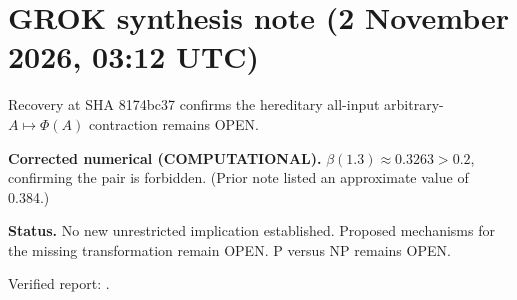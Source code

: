 \section*{GROK synthesis note (2 November 2026, 03:12 UTC)}
\label{sec:grok-0312}

Recovery at SHA 8174bc37 confirms the hereditary all-input arbitrary-$A\mapsto\Phi(A)$ contraction remains OPEN.

\textbf{Corrected numerical (COMPUTATIONAL).}
$\beta(1.3)\approx 0.3263 > 0.2$, confirming the pair is forbidden. (Prior note listed an approximate value of 0.384.)

\textbf{Status.}
No new unrestricted implication established. Proposed mechanisms for the missing transformation remain OPEN. P versus NP remains OPEN.

Verified report:
.
